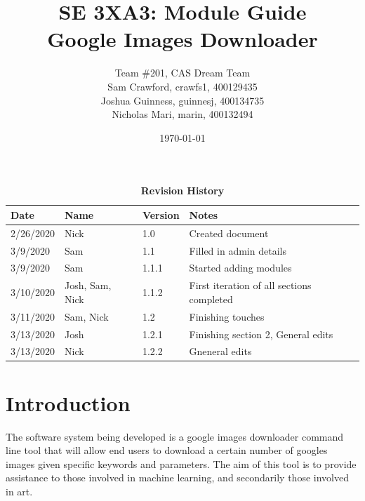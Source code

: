\documentclass[12pt, titlepage]{article}
\title{SE 3XA3: Module Guide\\Google Images Downloader}
\author{Team \#201, CAS Dream Team
		\\ Sam Crawford, crawfs1, 400129435
		\\ Joshua Guinness, guinnesj, 400134735
		\\ Nicholas Mari, marin, 400132494
}
\date{\today}
\begin{document}
\maketitle

\tableofcontents
\listoftables
\listoffigures

\begin{table}[tp]
\begin{tabularx}{\textwidth}{lllp{7.5cm}}
\toprule {\bf Date} & {\bf Name} & {\bf Version} & {\bf Notes}\\
\midrule
2/26/2020 & Nick & 1.0 & Created document\\
3/9/2020 & Sam & 1.1 & Filled in admin details\\
3/9/2020 & Sam & 1.1.1 & Started adding modules\\
3/10/2020 & Josh, Sam, Nick & 1.1.2 & First iteration of all sections completed\\
3/11/2020 & Sam, Nick & 1.2 & Finishing touches\\
3/13/2020 & Josh & 1.2.1 & Finishing section 2, General edits\\
3/13/2020 & Nick & 1.2.2 & Gneneral edits\\
\bottomrule
\end{tabularx}
\caption{\bf Revision History}
\end{table}


\newpage


\section{Introduction}

The software system being developed is a google images downloader command line tool that
will allow end users to download a certain number of googles images given
specific keywords and parameters. The aim of this tool is to provide assistance to those
involved in machine learning, and secondarily those involved in art.
\end{document}
